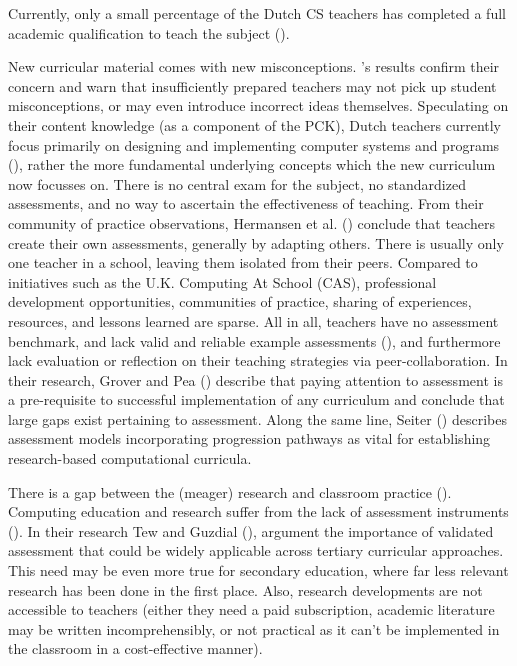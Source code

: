 Currently, only a small percentage of the Dutch CS teachers has completed a full academic qualification to teach the subject (\cite{tolboom2014informatica}). 

New curricular material comes with new misconceptions. \cite{duncan2017teachers}'s results confirm their concern and warn that insufficiently prepared teachers may not pick up student misconceptions, or may even introduce incorrect ideas themselves. Speculating on their content knowledge (as a component of the PCK), Dutch teachers currently focus primarily on designing and implementing computer systems and programs (\cite{Schmidt2007}), rather the more fundamental underlying concepts which the new curriculum now focusses on. There is no central exam for the subject, no standardized assessments, and no way to ascertain the effectiveness of teaching. From their community of practice observations, Hermansen et al. (\cite{hermansen2014reworking}) conclude that teachers create their own assessments, generally by adapting others. There is usually only one teacher in a school, leaving them isolated from their peers. Compared to initiatives such as the U.K. Computing At School (CAS), professional development opportunities, communities of practice, sharing of experiences, resources, and lessons learned are sparse. All in all, teachers have no assessment benchmark, and lack valid and reliable example assessments (\cite{Yadav2015}), and furthermore lack evaluation or reflection on their teaching strategies via peer-collaboration. In their research, Grover and Pea (\cite{GroverPea2013}) describe that paying attention to assessment is a pre-requisite to successful implementation of any curriculum and conclude that large gaps exist pertaining to assessment. Along the same line, Seiter (\cite{2013Seiter}) describes assessment models incorporating progression pathways as vital for establishing research-based computational curricula.


There is a gap between the (meager) research and classroom practice (\cite{Yadav2015}).  Computing education and research suffer from the lack of assessment instruments (\cite{voogt2017effecten}). In their research Tew and Guzdial (\cite{2010TewGuzdial}), argument the importance of validated assessment that could be widely applicable across tertiary curricular approaches. This need may be even more true for secondary education, where far less relevant research has been done in the first place. Also, research developments are not accessible to teachers (either they need a paid subscription, academic literature may be written incomprehensibly, or not practical as it can't be implemented in the classroom in a cost-effective manner).

